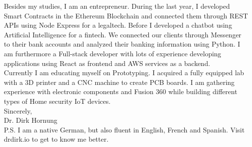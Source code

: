 \documentclass[11pt]{article}
\begin{document}
 \noindent Besides my studies, I am an entrepreneur. During the last year, I
 developed Smart Contracts in the Ethereum Blockchain and connected them through
 REST APIs using Node Express for a legaltech. Before I developed a chatbot
 using Artificial Intelligence for a fintech. We connected our clients through
 Messenger to their bank accounts and analyzed their banking information using
 Python. I am furthermore a Full-stack developer with lots of experience
 developing applications using React as frontend and AWS services as a backend.  \\

 \noindent Currently I am educating myself on Prototyping. I acquired a fully
 equipped lab with a 3D printer and a CNC machine to create PCB boards. I am
 gathering experience with electronic components and Fusion 360 while building
 different types of Home security IoT devices.\\

 \noindent Sincerely, \\
 Dr. Dirk Hornung \\

 \noindent P.S. I am a native German, but also fluent in English, French and
 Spanish. Visit drdirk.io to get to know me better.

 
\end{document}
